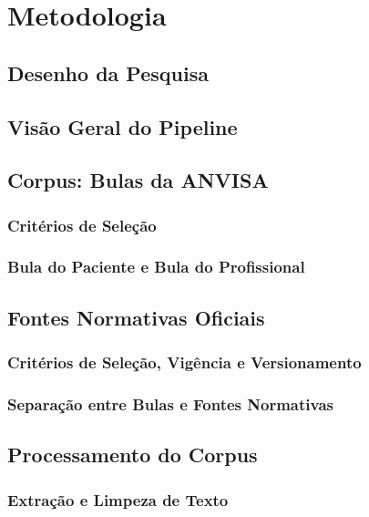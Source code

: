 \chapter{Metodologia}

\section{Desenho da Pesquisa}

\section{Visão Geral do Pipeline}

\section{Corpus: Bulas da ANVISA}

\subsection{Critérios de Seleção}


\subsection{Bula do Paciente e Bula do Profissional}

\section{Fontes Normativas Oficiais}

\subsection{Critérios de Seleção, Vigência e Versionamento}

\subsection{Separação entre Bulas e Fontes Normativas}

\section{Processamento do Corpus}

\subsection{Extração e Limpeza de Texto}

